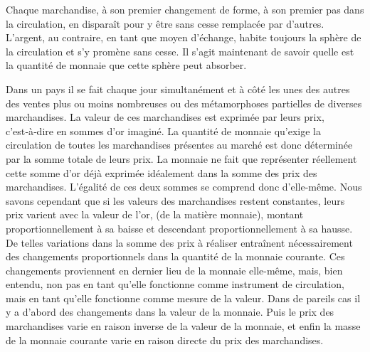 \documentclass[french,twoside]{book} %
\begin{document}
Chaque marchandise, à son premier changement de forme, à son premier pas dans la circulation, en disparaît pour y être sans cesse remplacée par d’autres. L’argent, au contraire, en tant que moyen d’échange, habite toujours la sphère de la circulation et s’y promène sans cesse. Il s’agit maintenant de savoir quelle est la quantité de monnaie que cette sphère peut absorber.\par
Dans un pays il se fait chaque jour simultanément et à côté les unes des autres des ventes plus ou moins nombreuses ou des métamorphoses partielles de diverses marchandises. La valeur de ces marchandises est exprimée par leurs prix, c’est‑à‑dire en sommes d’or imaginé. La quantité de monnaie qu’exige la circulation de toutes les marchandises présentes au marché est donc déterminée par la somme totale de leurs prix. La monnaie ne fait que représenter réellement cette somme d’or déjà exprimée idéalement dans la somme des prix des marchandises. L’égalité de ces deux sommes se comprend donc d’elle-même. Nous savons cependant que si les valeurs des marchandises restent constantes, leurs prix varient avec la valeur de l’or, (de la matière monnaie), montant proportionnellement à sa baisse et descendant proportionnellement à sa hausse. De telles variations dans la somme des prix à réaliser entraînent nécessairement des changements proportionnels dans la quantité de la monnaie courante. Ces changements proviennent en dernier lieu de la monnaie elle-même, mais, bien entendu, non pas en tant qu’elle fonctionne comme instrument de circulation, mais en tant qu’elle fonctionne comme mesure de la valeur. Dans de pareils cas il y a d’abord des changements dans la valeur de la monnaie. Puis le prix des marchandises varie en raison inverse de la valeur de la monnaie, et enfin la masse de la monnaie courante varie en raison directe du prix des marchandises.\par
\end{document}
